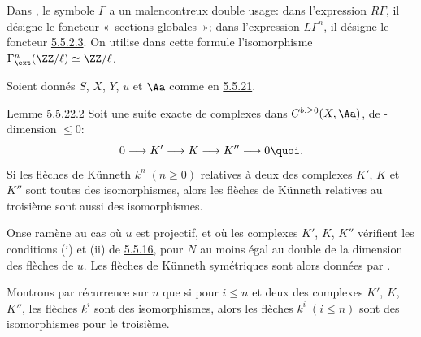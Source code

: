 \documentclass[10pt]{../fichiers-configuration-latex/smfart}
\begin{document}
Dans , le symbole $\Gamma$ a un malencontreux
double usage:
dans l'expression $R\Gamma$, il désigne le foncteur « sections
globales »; dans l'expression $L\Gamma^{n}$, il désigne le foncteur
\hyperref[XVII.par5.5.2.3]{5.5.2.3}. On utilise dans cette formule l'isomorphisme
$\Gamma^{n}_{\ext}(\ZZ/\ell)\simeq \ZZ/\ell$.

Soient donnés $S$, $X$, $Y$, $u$ et $\Aa$ comme en \hyperref[XVII.thm5.5.21]{5.5.21}.

\begin{enonce*}{Lemme 5.5.22.2}
Soit une suite exacte de complexes dans $C^{b,\geq 0}(X,\Aa)$,
de \ttor-dimension $\leq 0$:
$$
0\longrightarrow K'\longrightarrow K\longrightarrow K''\longrightarrow
0{\quoi}.
$$
Si les flèches de K\"unneth $k^{n}\;(n\geq 0)$ relatives à deux des
complexes $K'$, $K$ et $K''$ sont toutes des isomorphismes, alors les
flèches de K\"unneth relatives au troisième sont aussi des isomorphismes.
\end{enonce*}

On\pageoriginale se ramène au cas où $u$ est projectif, et où les
complexes $K'$, $K$, $K''$ vérifient les conditions (i) et (ii) de
\hyperref[XVII.lem5.5.16]{5.5.16}, pour $N$ au moins égal au double de la dimension des flèches
de $u$. Les flèches de Künneth symétriques sont alors données par
.

Montrons par récurrence sur $n$ que si pour $i\leq n$ et deux des
complexes $K'$, $K$, $K''$, les flèches $k^{i}$ sont des
isomorphismes, alors les flèches $k^{i}\;(i\leq n)$ sont des
isomorphismes pour le troisième.
\end{document}
